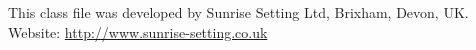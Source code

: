 \documentclass[Afour,sageh,times]{includes/tex/sagej}
\begin{document}
\begin{acks}
This class file was developed by Sunrise Setting Ltd, Brixham, Devon, UK. \\
Website: \url{http://www.sunrise-setting.co.uk}
\end{acks}



\end{document}
